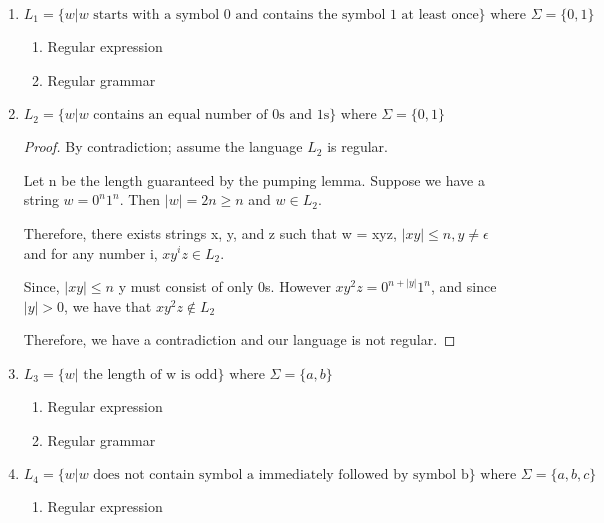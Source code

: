 \begin{enumerate}
	\item\(L_1 = \{ w | w \text{ starts with a symbol 0 and contains the symbol 1 at least once} \} \text{ where } \Sigma = \{ 0, 1 \} \)
	
	\begin{enumerate}
		\item{Regular expression}
				
		\item{Regular grammar}
		
	\end{enumerate}
	
	\item\(L_2 = \{ w | w \text{ contains an equal number of 0s and 1s} \} \text{ where } \Sigma = \{ 0, 1 \} \)
	
	\begin{proof}
	By contradiction; assume the language \(L_2\) is regular. 
	
	Let n be the length guaranteed by the pumping lemma. Suppose we have a string \( w = 0^n 1^n \).  Then \( | w | = 2 n \geq n \) and \( w \in L_2 \).  
	
	Therefore, there exists strings x, y, and z such that w = xyz, \( | xy | \leq n, y \neq \epsilon \) and for any number i, \( xy^iz \in L_2 \). 
	
	Since, \( | x y | \leq n \) y must consist of only 0s.  However \(xy^2z = 0^{n + |y|}1^n \), and since \( |y| > 0 \), we have that \(xy^2z \notin L_2 \)
	
	Therefore, we have a contradiction and our language is not regular.
	\end{proof}
	
	\item\(L_3 = \{ w | \text{ the length of w is odd} \} \text{ where } \Sigma = \{ a, b \} \)
	
	\begin{enumerate}
		\item{Regular expression}
		
		\item{Regular grammar}
		
	\end{enumerate}
	
	\item\(L_4 = \{ w | w \text{ does not contain symbol a immediately followed by symbol b} \} \text{ where } \Sigma = \{ a, b, c \} \)
	
	\begin{enumerate}
		\item{Regular expression}
		

\end{enumerate}
\end{enumerate}
